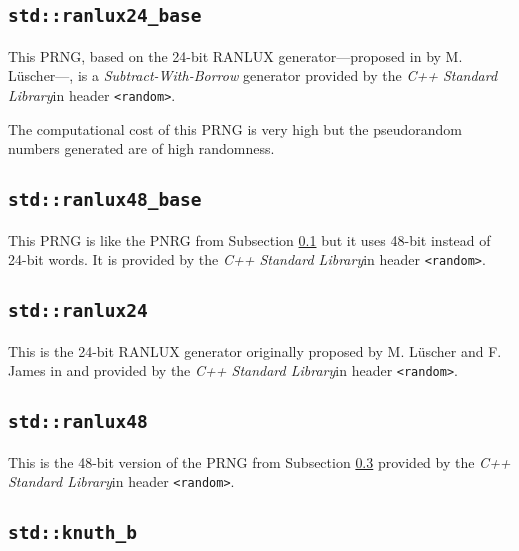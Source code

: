 \subsection[\lstinline{std::ranlux24_base}]{\lstinline{std::ranlux24_base}} \label{subsec:ranlux24_base}

	This PRNG, based on the 24-bit RANLUX generator---proposed in \cite{Luescher:1993} by M. Lüscher---, is a \emph{Subtract-With-Borrow} generator provided by the \textit{C++ Standard Library}\footnotemark[1] in header  \lstinline{<random>}\footnotemark[2].
	
	The computational cost of this PRNG is very high but the pseudorandom numbers generated are of high randomness.

\subsection[\lstinline{std::ranlux48_base}]{\lstinline{std::ranlux48_base}} \label{subsec:ranlux48_base}

	This PRNG is like the PNRG from Subsection \ref{subsec:ranlux24_base} but it uses 48-bit instead of 24-bit words. It is provided by the \textit{C++ Standard Library}\footnotemark[1] in header  \lstinline{<random>}\footnotemark[2].

\subsection[\lstinline{std::ranlux24}]{\lstinline{std::ranlux24}} \label{subsec:ranlux24}

	This is the 24-bit RANLUX generator originally proposed by M. Lüscher and F. James in \cite{Luescher:1993} and \cite{James:1993} provided by the \textit{C++ Standard Library}\footnotemark[1] in header  \lstinline{<random>}\footnotemark[2].

\subsection[\lstinline{std::ranlux48}]{\lstinline{std::ranlux48}} \label{subsec:ranlux48}

	This is the 48-bit version of the PRNG from Subsection \ref{subsec:ranlux24} provided by the \textit{C++ Standard Library}\footnotemark[1] in header  \lstinline{<random>}\footnotemark[2].

\subsection[\lstinline{std::knuth_b}]{\lstinline{std::knuth_b}} \label{subsec:knuth_b}

